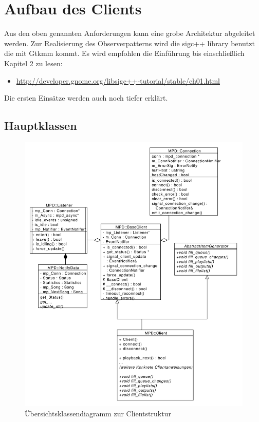 \section{Aufbau des Clients}

Aus den oben genannten Anforderungen kann eine grobe Architektur abgeleitet werden.
Zur Realisierung des Observerpatterns wird die sigc++ library benutzt die mit Gtkmm kommt.
Es wird empfohlen die Einführung bis einschließlich Kapitel 2 zu lesen:
\begin{itemize}
\item \url{http://developer.gnome.org/libsigc++-tutorial/stable/ch01.html}
\end{itemize}
Die ersten Einsätze werden auch noch tiefer erklärt.

\newpage
\subsection{Hauptklassen}
\begin{figure}[htb!]
	\centering
        \includegraphics[scale=0.5]{ClientCollab.pdf}
	\caption{Übersichtsklassendiagramm zur Clientstruktur}
	\label{class_client_all}
\end{figure}

